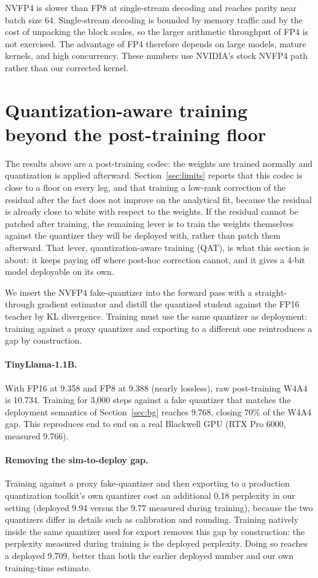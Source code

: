 \documentclass[11pt]{article}
\begin{document}
NVFP4 is slower than FP8 at single-stream decoding and reaches parity near batch size
64. Single-stream decoding is bounded by memory traffic and by the cost of unpacking the
block scales, so the larger arithmetic throughput of FP4 is not exercised. The advantage
of FP4 therefore depends on large models, mature kernels, and high concurrency. These
numbers use NVIDIA's stock NVFP4 path rather than our corrected kernel.

\section{Quantization-aware training beyond the post-training floor}\label{sec:qat}
The results above are a post-training codec: the weights are trained normally and
quantization is applied afterward. Section~\ref{sec:limits} reports that this codec is
close to a floor on every leg, and that training a low-rank correction of the residual
after the fact does not improve on the analytical fit, because the residual is already
close to white with respect to the weights. If the residual cannot be patched
after training, the remaining lever is to train the weights themselves against the
quantizer they will be deployed with, rather than patch them afterward. That lever,
quantization-aware training (QAT), is what this section is about: it keeps paying off
where post-hoc correction cannot, and it gives a 4-bit model deployable on its own.

We insert the NVFP4 fake-quantizer into the forward pass with a straight-through
gradient estimator and distill the quantized student against the FP16 teacher by KL
divergence. Training must use the same quantizer as deployment: training against a
proxy quantizer and exporting to a different one reintroduces a gap by construction.

\paragraph{TinyLlama-1.1B.} With FP16 at 9.358 and FP8 at 9.388 (nearly lossless), raw
post-training W4A4 is 10.734. Training for 3{,}000 steps against a fake quantizer that
matches the deployment semantics of Section~\ref{sec:bg} reaches 9.768, closing 70\% of
the W4A4 gap. This reproduces end to end on a real Blackwell GPU (RTX Pro 6000, measured
9.766).

\paragraph{Removing the sim-to-deploy gap.} Training against a proxy fake-quantizer and
then exporting to a production quantization toolkit's own quantizer cost an additional
0.18 perplexity in our setting (deployed 9.94 versus the 9.77 measured during training),
because the two quantizers differ in details such as calibration and rounding. Training
natively inside the same quantizer used for export removes this gap by construction: the
perplexity measured during training is the deployed perplexity. Doing so reaches a
deployed 9.709, better than both the earlier deployed number and our own training-time
estimate.
\end{document}
